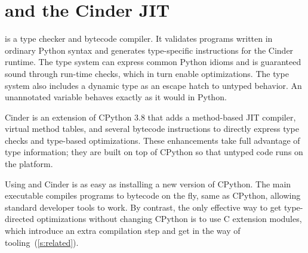 \documentclass[a4paper,english,cleveref,autoref,thm-restate,anonymous,]{lipics-v2021}
\begin{document}
\section{\SP{} and the Cinder JIT}
\label{s:tour}


\SP{} is a type checker and bytecode compiler.
It validates programs written in ordinary Python syntax
and generates type-specific instructions for the Cinder runtime.
The type system can express common Python idioms and is guaranteed
sound through run-time checks, which in turn enable optimizations.
The type system also includes a dynamic type as an escape hatch to
untyped behavior.
An unannotated variable behaves exactly as it would in Python.

Cinder is an extension of CPython 3.8 that adds a method-based
JIT compiler, virtual method tables, and several bytecode instructions
to directly express type checks and type-based optimizations.
These enhancements take full advantage of \SP{} type information;
they are built on top of CPython so that untyped code runs on
the platform.

Using \SP{} and Cinder is as easy as installing a new version
of CPython.
The main executable compiles programs to bytecode on the fly,
same as CPython, allowing standard developer tools to work.
By contrast, the only effective way to get type-directed optimizations
without changing CPython is to use C extension modules,
which introduce an extra compilation step and get in the way
of tooling~(\cref{s:related}).
\end{document}
